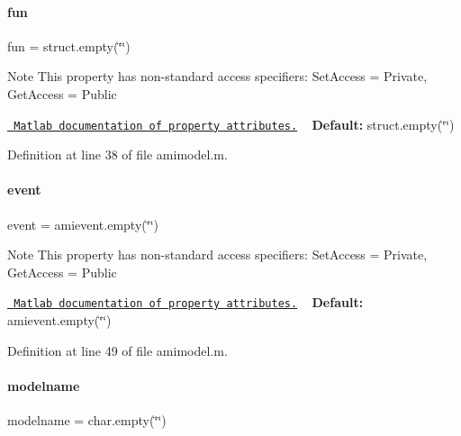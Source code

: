 \paragraph{\texorpdfstring{fun}{fun}}
{\footnotesize\ttfamily fun = struct.\+empty(\char`\"{}\char`\"{})}

\begin{DoxyNote}{Note}
This property has non-\/standard access specifiers\+: {\ttfamily Set\+Access = Private, Get\+Access = Public} 

\href{http://www.mathworks.com/help/matlab/matlab_oop/property-attributes.html}{\texttt{ Matlab documentation of property attributes.}} ~\newline
{\bfseries{Default\+:}} struct.\+empty(\char`\"{}\char`\"{}) 
\end{DoxyNote}


Definition at line 38 of file amimodel.\+m.

\mbox{\label{classamimodel_a3b65133bb9997cd1ccf311af0927fc9e}} 
\paragraph{\texorpdfstring{event}{event}}
{\footnotesize\ttfamily event = amievent.\+empty(\char`\"{}\char`\"{})}

\begin{DoxyNote}{Note}
This property has non-\/standard access specifiers\+: {\ttfamily Set\+Access = Private, Get\+Access = Public} 

\href{http://www.mathworks.com/help/matlab/matlab_oop/property-attributes.html}{\texttt{ Matlab documentation of property attributes.}} ~\newline
{\bfseries{Default\+:}} amievent.\+empty(\char`\"{}\char`\"{}) 
\end{DoxyNote}


Definition at line 49 of file amimodel.\+m.

\mbox{\label{classamimodel_a71bca9c21a6de42d8079ade31cb61044}} 
\paragraph{\texorpdfstring{modelname}{modelname}}
{\footnotesize\ttfamily modelname = char.\+empty(\char`\"{}\char`\"{})}

